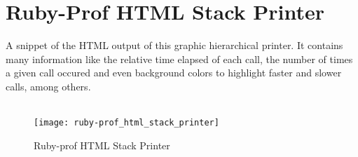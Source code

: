 \chapter{Ruby-Prof HTML Stack Printer} %
\label{ap:ruby-prof_html_stack_printer}

A snippet of the HTML output of this graphic hierarchical printer. It contains many information like the relative time elapsed of each call, the number of times a given call occured and even background colors to highlight faster and slower calls, among others.\\\\

\begin{figure}[h]
  \centering
    \texttt{[image: ruby-prof\_html\_stack\_printer]}
  \caption{Ruby-prof HTML Stack Printer}
  \label{fig:ruby-prof_html_stack_printer}
\end{figure}
